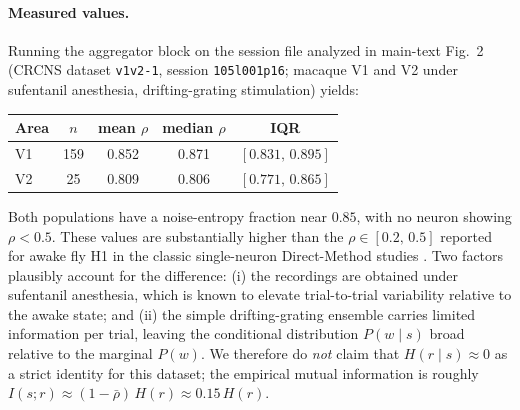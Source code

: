 \documentclass[11pt]{article}
\theoremstyle{remark}
\theoremstyle{definition}
\begin{document}
\paragraph{Measured values.}
Running the aggregator block on the session file analyzed in main-text Fig.~2 (CRCNS dataset \texttt{v1v2-1}, session \texttt{105l001p16}; macaque V1 and V2 under sufentanil anesthesia, drifting-grating stimulation) yields:
\begin{center}
\begin{tabular}{lcccc}
\toprule
Area & $n$ & mean $\rho$ & median $\rho$ & IQR \\
\midrule
V1 & 159 & 0.852 & 0.871 & $[0.831,\,0.895]$ \\
V2 & \phantom{0}25 & 0.809 & 0.806 & $[0.771,\,0.865]$ \\
\bottomrule
\end{tabular}
\end{center}
Both populations have a noise-entropy fraction near $0.85$, with no neuron showing $\rho<0.5$.  These values are substantially higher than the $\rho\in[0.2,\,0.5]$ reported for awake fly H1 in the classic single-neuron Direct-Method studies \cite{strong1998entropy, 97bialek}.  Two factors plausibly account for the difference: (i) the recordings are obtained under sufentanil anesthesia, which is known to elevate trial-to-trial variability relative to the awake state; and (ii) the simple drifting-grating ensemble carries limited information per trial, leaving the conditional distribution $P(w\mid s)$ broad relative to the marginal $P(w)$.  We therefore do \emph{not} claim that $H(r\mid s)\approx 0$ as a strict identity for this dataset; the empirical mutual information is roughly $I(s;r)\approx (1-\bar\rho)\,H(r)\approx 0.15\,H(r)$.
\end{document}
